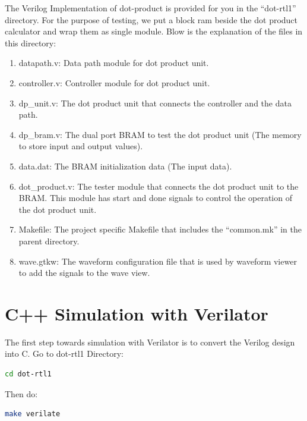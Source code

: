 \documentclass[12pt]{article}
\begin{document}
The Verilog Implementation of dot-product is provided for you in the
“dot-rtl1” directory. For the purpose of testing, we put a block ram
beside the dot product calculator and wrap them as single module. Blow
is the explanation of the files in this directory:

\begin{enumerate}
  
\item datapath.v: Data path module for dot product unit.
  
\item controller.v: Controller module for dot product unit.
  
\item dp\_unit.v: The dot product unit that connects the controller
  and the data path.
  
\item dp\_bram.v: The dual port BRAM to test the dot product unit (The
  memory to store input and output values).
  
\item data.dat: The BRAM initialization data (The input data).
  
\item dot\_product.v: The tester module that connects the dot product
  unit to the BRAM. This module has start and done signals to control
  the operation of the dot product unit.
  
\item Makefile: The project specific Makefile that includes the
  “common.mk” in the parent directory.

\item wave.gtkw: The waveform configuration file that is used by
  waveform viewer to add the signals to the wave view.

\end{enumerate}

\section{C++ Simulation with Verilator}

The first step towards simulation with Verilator is to convert the
Verilog design into C. Go to dot-rtl1 Directory:

\begin{lstlisting}[language=bash]
cd dot-rtl1
\end{lstlisting}

Then do:

\begin{lstlisting}[language=bash]
make verilate
\end{lstlisting}
\end{document}
